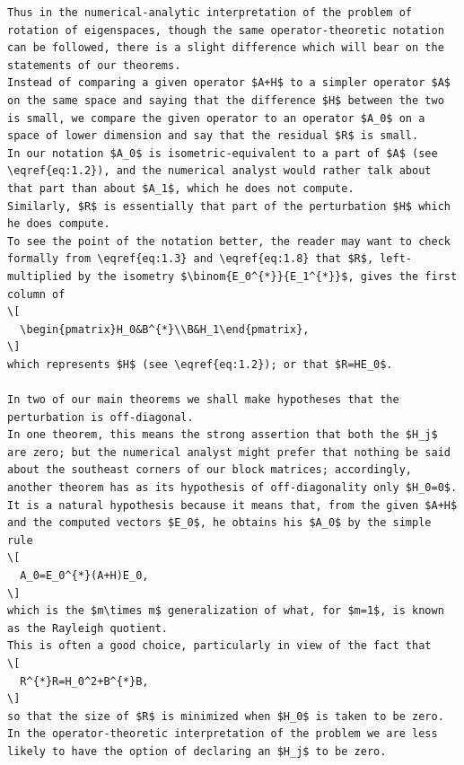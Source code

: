 \begin{verbatim}
Thus in the numerical-analytic interpretation of the problem of rotation of eigenspaces, though the same operator-theoretic notation can be followed, there is a slight difference which will bear on the statements of our theorems.
Instead of comparing a given operator $A+H$ to a simpler operator $A$ on the same space and saying that the difference $H$ between the two is small, we compare the given operator to an operator $A_0$ on a space of lower dimension and say that the residual $R$ is small.
In our notation $A_0$ is isometric-equivalent to a part of $A$ (see \eqref{eq:1.2}), and the numerical analyst would rather talk about that part than about $A_1$, which he does not compute.
Similarly, $R$ is essentially that part of the perturbation $H$ which he does compute.
To see the point of the notation better, the reader may want to check formally from \eqref{eq:1.3} and \eqref{eq:1.8} that $R$, left-multiplied by the isometry $\binom{E_0^{*}}{E_1^{*}}$, gives the first column of
\[
  \begin{pmatrix}H_0&B^{*}\\B&H_1\end{pmatrix},
\]
which represents $H$ (see \eqref{eq:1.2}); or that $R=HE_0$.

In two of our main theorems we shall make hypotheses that the perturbation is off-diagonal.
In one theorem, this means the strong assertion that both the $H_j$ are zero; but the numerical analyst might prefer that nothing be said about the southeast corners of our block matrices; accordingly, another theorem has as its hypothesis of off-diagonality only $H_0=0$.
It is a natural hypothesis because it means that, from the given $A+H$ and the computed vectors $E_0$, he obtains his $A_0$ by the simple rule
\[
  A_0=E_0^{*}(A+H)E_0,
\]
which is the $m\times m$ generalization of what, for $m=1$, is known as the Rayleigh quotient.
This is often a good choice, particularly in view of the fact that
\[
  R^{*}R=H_0^2+B^{*}B,
\]
so that the size of $R$ is minimized when $H_0$ is taken to be zero.
In the operator-theoretic interpretation of the problem we are less likely to have the option of declaring an $H_j$ to be zero.
\end{verbatim}


